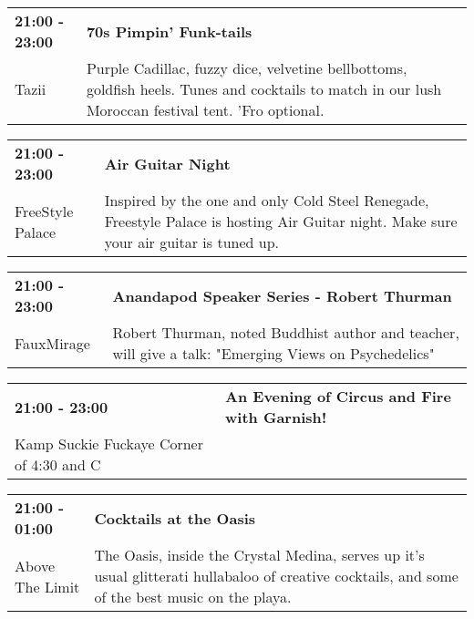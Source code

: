 \begin{tabular}{ p{1in} p{2.2in} }
    \textbf{21:00 - 23:00} & \textbf{70s Pimpin' Funk-tails} \\
    Tazii \newline  & Purple Cadillac, fuzzy dice, velvetine bellbottoms, goldfish heels.  Tunes and cocktails to match in our lush Moroccan festival tent.  'Fro optional. \\
    \hline 
\end{tabular}
    
\begin{tabular}{ p{1in} p{2.2in} }
    \textbf{21:00 - 23:00} & \textbf{Air Guitar Night} \\
    FreeStyle Palace \newline  & Inspired by the one and only Cold Steel Renegade, Freestyle Palace is hosting Air Guitar night.  Make sure your air guitar is tuned up. \\
    \hline 
\end{tabular}
    
\begin{tabular}{ p{1in} p{2.2in} }
    \textbf{21:00 - 23:00} & \textbf{Anandapod Speaker Series - Robert Thurman} \\
    FauxMirage \newline  & Robert Thurman, noted Buddhist author and teacher, will give a talk: "Emerging Views on Psychedelics" \\
    \hline 
\end{tabular}
    
\begin{tabular}{ p{1in} p{2.2in} }
    \textbf{21:00 - 23:00} & \textbf{An Evening of Circus and Fire with Garnish!} \\
    Kamp Suckie Fuckaye \newline Corner of 4:30 and C &  \\
    \hline 
\end{tabular}
    
\begin{tabular}{ p{1in} p{2.2in} }
    \textbf{21:00 - 01:00} & \textbf{Cocktails at the Oasis} \\
    Above The Limit \newline  & The Oasis, inside the Crystal Medina, serves up it's usual glitterati hullabaloo of creative cocktails, and some of the best music on the playa. \\
    \hline 
\end{tabular}
    
